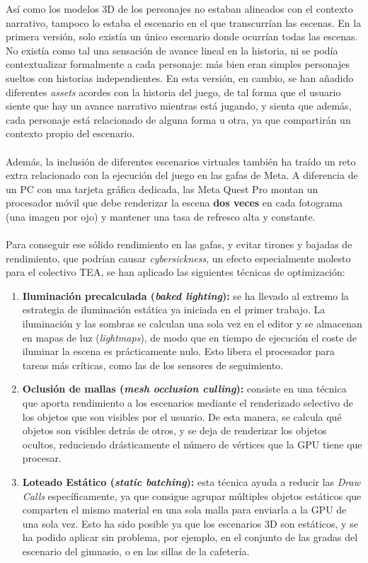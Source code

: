\documentclass[12pt,twoside,titlepage]{report}
\begin{document}
Así como los modelos 3D de los personajes no estaban alineados con el contexto narrativo, tampoco lo estaba el escenario en el que transcurrían las escenas.
En la primera versión, solo existía un único escenario donde ocurrían todas las escenas. No existía como tal una sensación de avance lineal en la historia, ni se podía contextualizar formalmente a cada personaje: más bien eran simples personajes sueltos con historias independientes.
En esta versión, en cambio, se han añadido diferentes \textit{assets} acordes con la historia del juego, de tal forma que el usuario siente que hay un avance narrativo mientras está jugando, y sienta que además, cada personaje está relacionado de alguna forma u otra, ya que compartirán un contexto propio del escenario.
\\\\
Además, la inclusión de diferentes escenarios virtuales también ha traído un reto extra relacionado con la ejecución del juego en las gafas de Meta.
A diferencia de un PC con una tarjeta gráfica dedicada, las Meta Quest Pro montan un procesador móvil que debe renderizar la escena \textbf{dos veces} en cada fotograma (una imagen por ojo) y mantener una tasa de refresco alta y constante.
\\\\
Para conseguir ese sólido rendimiento en las gafas, y evitar tirones y bajadas de rendimiento, que podrían causar \textit{cybersickness}, un efecto especialmente molesto para el colectivo TEA, se han aplicado las siguientes técnicas de optimización:

\begin{enumerate}[label=\textbf{\arabic*.}, leftmargin=1.5cm, itemsep=0.5em]
  \item \textbf{Iluminación precalculada (\textit{baked lighting}):} se ha llevado al extremo la estrategia de iluminación estática ya iniciada en el primer trabajo.
La iluminación y las sombras se calculan una sola vez en el editor y se almacenan en mapas de luz (\textit{lightmaps}), de modo que en tiempo de ejecución el coste de iluminar la escena es prácticamente nulo.
Esto libera el procesador para tareas más críticas, como las de los sensores de seguimiento.
  \item \textbf{Oclusión de mallas (\textit{mesh occlusion culling}):} consiste en una técnica que aporta rendimiento a los escenarios mediante el renderizado selectivo de los objetos que son visibles por el usuario.
De esta manera, se calcula qué objetos son visibles detrás de otros, y se deja de renderizar los objetos ocultos, reduciendo drásticamente el número de vértices que la GPU tiene que procesar.
  \item \textbf{Loteado Estático (\textit{static batching}):} esta técnica ayuda a reducir las \textit{Draw Calls} específicamente, ya que consigue agrupar múltiples objetos estáticos que comparten el mismo material en una sola malla para enviarla a la GPU de una sola vez.
Esto ha sido posible ya que los escenarios 3D son estáticos, y se ha podido aplicar sin problema, por ejemplo, en el conjunto de las gradas del escenario del gimnasio, o en las sillas de la cafetería.
\end{enumerate}
\end{document}
